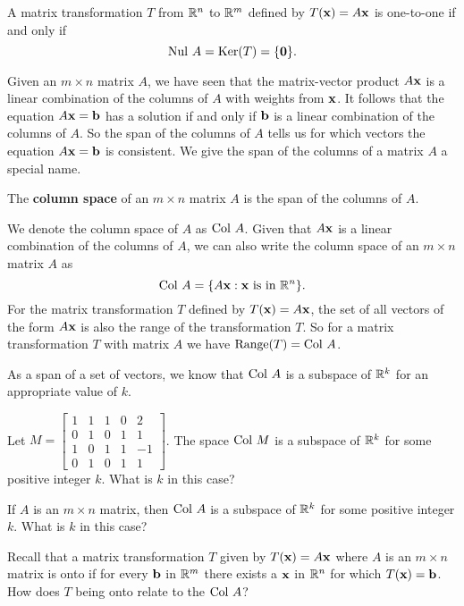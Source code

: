 \begin{theorem} \label{thm:3_b_one_to_one_kernel} A matrix transformation $T$ from $\mathbb{R}^n$ to $\mathbb{R}^m$ defined by $T(\mathbf{x}) = A\mathbf{x}$ is one-to-one if and only if 
\[\text{Nul } A = \text{Ker}(T) = \{\mathbf{0}\}.\] 
\end{theorem}



Given an $m \times n$ matrix $A$, we have seen that the matrix-vector product $A \mathbf{x}$ is a linear combination of the columns of $A$ with weights from $\mathbf{x}$. It follows that the equation $A \mathbf{x} = \mathbf{b}$ has a solution if and only if $\mathbf{b}$ is a linear combination of the columns of $A$. So the span of the columns of $A$ tells us for which vectors the equation $A \mathbf{x} = \mathbf{b}$ is consistent. We give the span of the columns of a matrix $A$ a special name. 


\begin{definition} The \textbf{column space} of an $m \times n$ matrix $A$ is the span of the columns of $A$.
\end{definition}


We denote the column space of $A$ as $\text{Col } A$. Given that $A \mathbf{x}$ is a linear combination of the columns of $A$, we can also write the column space of an $m \times n$ matrix $A$ as
\[\text{Col } A = \{A \mathbf{x} : \mathbf{x} \text{ is in } \mathbb{R}^n\}.\]
For the matrix transformation $T$ defined by $T(\mathbf{x}) = A\mathbf{x}$, the set of all vectors of the form $A \mathbf{x}$ is also the range of the transformation $T$. So for a matrix transformation $T$ with matrix $A$ we have $\text{Range}(T) = \text{Col } A$. 

\begin{activity} \label{act:3_b_2} As a span of a set of vectors, we know that $\text{Col } A$ is a subspace of $\mathbb{R}^k$ for an appropriate value of $k$.  
\ba
\item Let $M =  \left[ \begin{array}{ccccr} 1&1&1&0&2 \\ 0&1&0&1&1 \\ 1&0&1&1&-1 \\ 0&1&0&1&1 \end{array} \right]$. 
The space $\text{Col } M$ is a subspace of $\mathbb{R}^k$ for some positive integer $k$. What is $k$ in this case?


\item If $A$ is an $m \times n$ matrix, then $\text{Col } A$ is a subspace of $\mathbb{R}^k$ for some positive integer $k$. What is $k$ in this case?


\item Recall that a matrix transformation $T$ given by $T(\mathbf{x})=A\mathbf{x}$ where $A$ is an $m\times n$ matrix is onto if for every $\mathbf{b}$ in $\mathbb{R}^m$ there exists a $\mathbf{x}$ in $\mathbb{R}^n$ for which $T(\mathbf{x})=\mathbf{b}$. How does $T$ being onto relate to the $\text{Col } A$? 


\ea
\end{activity}

